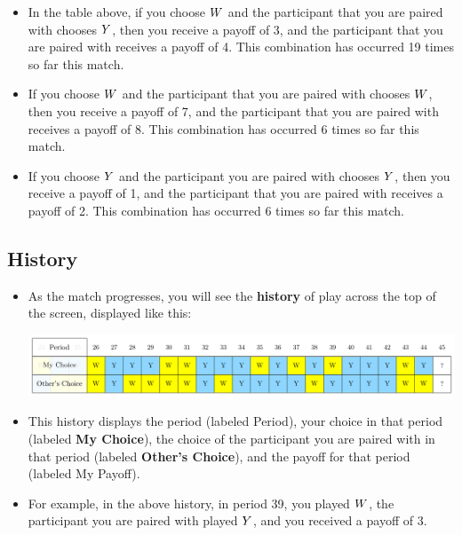 \documentclass[11pt]{article}
\newcommand{\dblbkt}[1]{}
\begin{document}
\begin{itemize}
{\bf Examples:}
\item In the table above, \dblbkt{1} if you choose $W$ and \dblbkt{1} the participant that you are paired with chooses $Y$, then \dblbkt{1} you receive a payoff of 3, and \dblbkt{1} the participant that you are paired with receives a payoff of 4.  \dblbkt{1} This combination has occurred 19 times so far this match. 
\item \dblbkt{1} If you choose $W$ and \dblbkt{1} the participant that you are paired with chooses $W$, then \dblbkt{1} you receive a payoff of 7, and \dblbkt{1} the participant that you are paired with receives a payoff of 8.  \dblbkt{1} This combination has occurred 6 times so far this match.
\item \dblbkt{1} If you choose $Y$ and \dblbkt{1} the participant you are paired with chooses $Y$, then \dblbkt{1} you receive a payoff of 1, and \dblbkt{1} the participant that you are paired with receives a payoff of 2.
 \dblbkt{1} This combination has occurred 6 times so far this match.
\end{itemize}

\subsection*{\dblbkt{3} History}

\begin{itemize} 
\item As the match progresses, you will see the {\bf history} of play across the top of the screen, displayed like this: \dblbkt{2}

\hspace{-1in}
  \includegraphics[width=7.5in]{pictures/history.pdf} 
\item This history displays \dblbkt{1} the period (labeled Period), \dblbkt{1} your choice in that period (labeled {\bf My Choice}), \dblbkt{1} the choice of the participant you are paired with in that period (labeled {\bf Other's Choice}), and \dblbkt{1} the payoff for that period (labeled My Payoff). 
\item For example, in the above history, \dblbkt{1} in period 39, \dblbkt{1} you played $W$, \dblbkt{1} the participant you are paired with played $Y$, \dblbkt{1} and you received a payoff of 3.
\end{itemize} 
\end{document}
